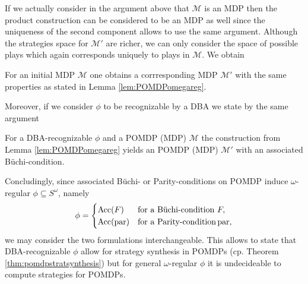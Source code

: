 If we actually consider in the argument above that $\mathcal{M}$ is an \ac{MDP} 
then the product construction can be considered to be an \ac{MDP} as well since 
the uniqueness of the second component allows to use the same argument. 
Although the strategies space for $\mathcal{M'}$ are richer, we can only 
consider the space of possible plays which again corresponds uniquely to plays 
in $\mathcal{M}$. We obtain
\begin{corollary}
  For an initial \ac{MDP} $\mathcal{M}$ one obtains a corrresponding \ac{MDP} 
  $\mathcal{M}'$ with the same properties as stated in Lemma 
  \ref{lem:POMDPomegareg}.
\end{corollary}
Moreover, if we consider $\phi$ to be recognizable by a \ac{DBA} we state by
the same argument
\begin{corollary}
  For a \ac{DBA}-recognizable $\phi$ and a \ac{POMDP} (\ac{MDP}) $\mathcal{M}$
  the construction from Lemma \ref{lem:POMDPomegareg} yields an \ac{POMDP} 
  (\ac{MDP}) $\mathcal{M'}$ with an associated Büchi-condition.
  \label{cor:POMDPDBA}
\end{corollary}
Concludingly, since associated Büchi- or Parity-conditions on
\ac{POMDP} induce $\omega$-regular $\phi\subseteq S^{\omega}$, namely
\begin{equation*}
  \phi = 
  \begin{cases}
    \operatorname{Acc}(F)&\text{for a Büchi-condition }F,\\
    \operatorname{Acc}(\operatorname{par})&\text{for a Parity-condition}\operatorname{par},
  \end{cases}
\end{equation*} 
we may consider the two formulations interchangeable. This allows to state that 
\ac{DBA}-recognizable $\phi$ allow for strategy synthesis in \acp{POMDP} (cp.
Theorem \ref{thm:pomdpstratsynthesis}) but for general $\omega$-regular $\phi$ 
it is undecideable to compute strategies for \acp{POMDP}. 

